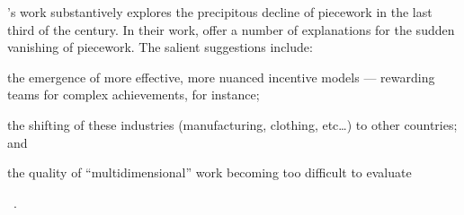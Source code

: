 \documentclass[trackingWork]{subfiles}
\begin{document}
\citeauthor{hart2013rise}'s work substantively explores the precipitous decline of piecework in the last third of the  century.
In their work, \citeauthor{hart2013rise} offer a number of explanations for the sudden vanishing of piecework.
The salient suggestions include:
\begin{inlinelist}
\item the emergence of more effective, more nuanced incentive models
--- rewarding teams for complex achievements, for instance;
\item the shifting of these industries (manufacturing, clothing, etc\dots)
to other countries; and
\item the quality of ``multidimensional'' work becoming too difficult to evaluate
\end{inlinelist}~\cite{hart2013rise}.

\onlyinsubfile{
  \printbibliography
  }
\end{document}
